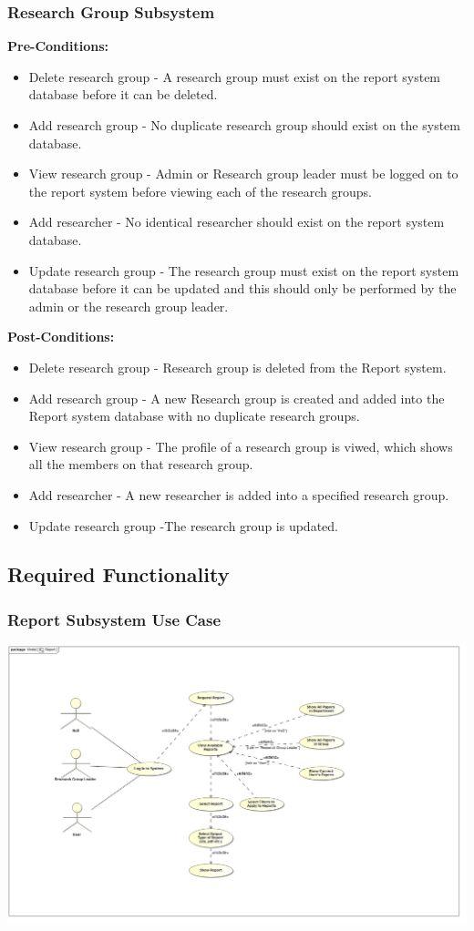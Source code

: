 \documentclass{article}
\begin{document}
	\subsubsection{Research Group Subsystem}
	\textbf{Pre-Conditions:}
	\begin{itemize}
	  \item Delete research group - A research group must exist on the report system database before it can be deleted.
	  \item Add research group - No duplicate research group should exist on the system database. 
	  \item View research group - Admin or Research group leader must be logged on to the  report system before  viewing  each of the research groups.
	  \item Add researcher - No identical researcher should exist on the report system database.
	 \item Update research group - The research group must exist on the report system database before it can be 	updated and this should only be performed by the admin or the research group leader.
	\end{itemize}
	\textbf{Post-Conditions:}
	
	\begin{itemize}
	  \item Delete research group - Research group is deleted from the  Report system. 
	  \item Add research group - A new Research group is created and added into the Report system database with no 				duplicate
	  research groups. 
	  \item View research group - The profile of a research group is viwed, which shows all the members on that 					research group.
	  \item Add researcher - A new researcher is added into a specified research group.
	  \item Update research group -The research group is updated.
	\end{itemize}
	
	
	\subsection{Required Functionality}
	\subsubsection{Report Subsystem Use Case}
	\includegraphics[width=\textwidth]{ReportUseCase}
\end{document}
